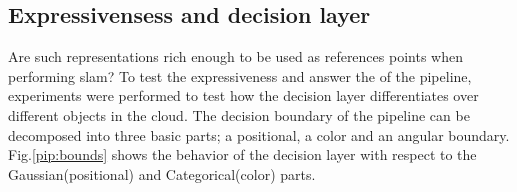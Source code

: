 \documentclass[twoside,hidelinks]{article}
\begin{document}
\subsection{Expressivensess and decision layer}

Are such representations rich enough to be used as references points when performing slam?
To test the expressiveness and answer the  of the pipeline, experiments were performed to test how the decision layer differentiates over different objects in the cloud. 
The decision boundary of the pipeline can be decomposed into three basic parts; a positional, a color and an angular boundary. Fig.\ref{pip:bounds} shows the behavior of the decision layer with respect to the Gaussian(positional) and Categorical(color) parts. 
    
\begin{figure}


\end{figure}
\end{document}
